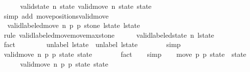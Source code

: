 \begin{isabellebody}
\ \ \ \ \isamarkupfalse%
\ {\isacharbackquoteopen}valid{\isacharunderscore}state\ n\ {\isacharquery}state{\isacharbackquoteclose}\ {\isacharbackquoteopen}valid{\isacharunderscore}move\ n\ {\isacharquery}state\ state{\isacharprime}{\isacharbackquoteclose}\isanewline
\ \ \ \ \isamarkupfalse%
\ {\isacharparenleft}simp\ add{\isacharcolon}\ move{\isacharunderscore}positions{\isacharunderscore}valid{\isacharunderscore}move{\isacharprime}{\isacharparenright}\isanewline
\isanewline
\ \ \isamarkupfalse%
\ {\isacharasterisk}{\isacharasterisk}{\isacharcolon}\ {\isachardoublequoteopen}valid{\isacharunderscore}labeled{\isacharunderscore}move{\isacharprime}\ n\ {\isacharquery}p{}\ {\isacharquery}p{}\ {\isacharquery}stone\ l{\isacharunderscore}state\ {\isacharquery}l{\isacharunderscore}state{\isacharprime}{\isachardoublequoteclose}\isanewline
\ \ \isamarkupfalse%
\ {\isacharparenleft}rule\ valid{\isacharunderscore}labeled{\isacharunderscore}move{\isacharunderscore}move{\isacharunderscore}max{\isacharunderscore}stone{\isacharparenright}\isanewline
\ \ \ \ \isamarkupfalse%
\ {\isachardoublequoteopen}valid{\isacharunderscore}labeled{\isacharunderscore}state\ n\ l{\isacharunderscore}state{\isachardoublequoteclose}\isanewline
\ \ \ \ \ \ \isamarkupfalse%
\ fact\isanewline
\ \ \isamarkupfalse%
\isanewline
\ \ \ \ \isamarkupfalse%
\ {\isachardoublequoteopen}unlabel\ l{\isacharunderscore}state\ {\isacharequal}\ unlabel\ l{\isacharunderscore}state{\isachardoublequoteclose}\isanewline
\ \ \ \ \ \ \isamarkupfalse%
\ simp\isanewline
\ \ \isamarkupfalse%
\isanewline
\ \ \ \ \isamarkupfalse%
\ {\isachardoublequoteopen}valid{\isacharunderscore}move{\isacharprime}\ n\ {\isacharquery}p{}\ {\isacharquery}p{}\ {\isacharquery}state\ state{\isacharprime}{\isachardoublequoteclose}\isanewline
\ \ \ \ \ \ \isamarkupfalse%
\ fact\isanewline
\ \ \isamarkupfalse%
\ simp\isanewline
\isanewline
\ \ \isamarkupfalse%
\ {\isachardoublequoteopen}move\ {\isacharquery}p{}\ {\isacharquery}p{}\ {\isacharquery}state\ {\isacharequal}\ state{\isacharprime}{\isachardoublequoteclose}\isanewline
\ \ \ \ \isamarkupfalse%
\ {\isacharbackquoteopen}valid{\isacharunderscore}move{\isacharprime}\ n\ {\isacharquery}p{}\ {\isacharquery}p{}\ {\isacharquery}state\ state{\isacharprime}{\isacharbackquoteclose}\isanewline

\end{isabellebody}
